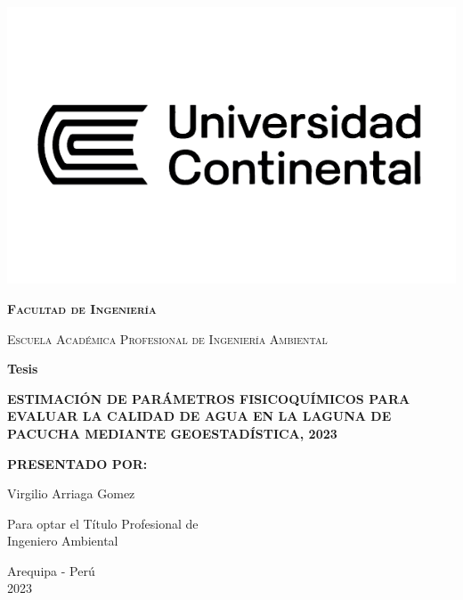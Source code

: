 \begin{titlepage}
    \vspace*{-2cm} %
    \hspace*{-2cm} %
    \includegraphics[scale=1]{Portada/uc.pdf}\\[0.2cm] %
\center
    {\scshape\LARGE \textbf{Facultad de Ingeniería}\par}
    \vspace{0.1cm}
    {\scshape\Large Escuela Académica Profesional de Ingeniería Ambiental\par}
    \vspace{0.2cm}
    {\LARGE\bfseries Tesis\par}
    \vspace{2mm}
    {\large\bfseries ESTIMACIÓN DE PARÁMETROS FISICOQUÍMICOS PARA EVALUAR LA CALIDAD DE AGUA EN LA LAGUNA DE PACUCHA MEDIANTE GEOESTADÍSTICA, 2023\par}
    \vspace{5mm}

     {\Large\bfseries PRESENTADO POR:\par}
    \vspace{5mm}
    {\Large Virgilio Arriaga Gomez\par}
    \vspace{5 mm}
    {\Large Para optar el Título Profesional de \\Ingeniero Ambiental\par}
    {\Large Arequipa - Perú \\ 2023\par}
\end{titlepage}



